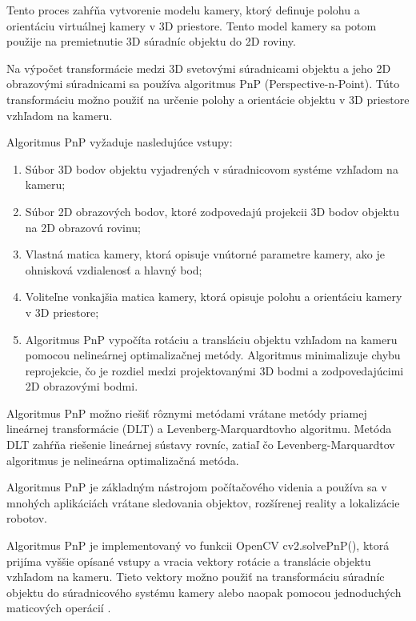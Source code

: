 {Tento proces zahŕňa vytvorenie modelu kamery, ktorý definuje polohu a orientáciu virtuálnej kamery v 3D priestore. Tento model kamery sa potom použije na premietnutie 3D súradníc objektu do 2D roviny.

Na výpočet transformácie medzi 3D svetovými súradnicami objektu a jeho 2D obrazovými súradnicami sa používa algoritmus PnP (Perspective-n-Point). Túto transformáciu možno použiť na určenie polohy a orientácie objektu v 3D priestore vzhľadom na kameru.

Algoritmus PnP vyžaduje nasledujúce vstupy:
\begin{enumerate}
\item Súbor 3D bodov objektu vyjadrených v súradnicovom systéme vzhľadom na kameru;
\item Súbor 2D obrazových bodov, ktoré zodpovedajú projekcii 3D bodov objektu na 2D obrazovú rovinu;
\item Vlastná matica kamery, ktorá opisuje vnútorné parametre kamery, ako je ohnisková vzdialenosť a hlavný bod;
\item Voliteľne vonkajšia matica kamery, ktorá opisuje polohu a orientáciu kamery v 3D priestore;
\item Algoritmus PnP vypočíta rotáciu a transláciu objektu vzhľadom na kameru pomocou nelineárnej optimalizačnej metódy. Algoritmus minimalizuje chybu reprojekcie, čo je rozdiel medzi projektovanými 3D bodmi a zodpovedajúcimi 2D obrazovými bodmi.
\end{enumerate}

Algoritmus PnP možno riešiť rôznymi metódami vrátane metódy priamej lineárnej transformácie (DLT) a Levenberg-Marquardtovho algoritmu. Metóda DLT zahŕňa riešenie lineárnej sústavy rovníc, zatiaľ čo Levenberg-Marquardtov algoritmus je nelineárna optimalizačná metóda.

Algoritmus PnP je základným nástrojom počítačového videnia a používa sa v mnohých aplikáciách vrátane sledovania objektov, rozšírenej reality a lokalizácie robotov.

Algoritmus PnP je implementovaný vo funkcii OpenCV cv2.solvePnP(), ktorá prijíma vyššie opísané vstupy a vracia vektory rotácie a translácie objektu vzhľadom na kameru. Tieto vektory možno použiť na transformáciu súradníc objektu do súradnicového systému kamery alebo naopak pomocou jednoduchých maticových operácií \citep{opencv_calib3d}.

}
